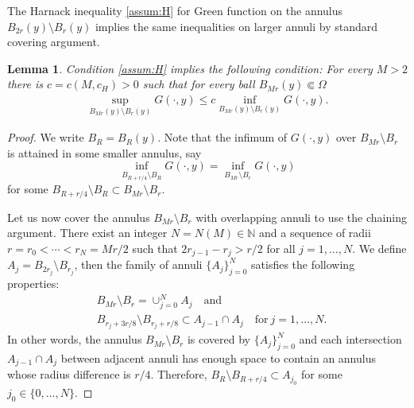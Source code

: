 \documentclass[reqno]{amsart}
\theoremstyle{plain}
\newtheorem{lemma}[theorem]{Lemma}
\theoremstyle{definition}
\numberwithin{equation}{section}
\newcommand{\cH} {c_H}
\begin{document}
The Harnack inequality \eqref{assum:H} for Green function on the annulus $B_{2r}(y) \setminus B_r(y)$ implies the same inequalities on larger annuli by standard covering argument.

\begin{lemma} \label{lem:Harnack}
Condition \eqref{assum:H} implies the following condition: For every $M >2$ there is $c=c(M, \cH) >0$ such that for every ball $B_{Mr}(y) \Subset \Omega$ 
\begin{align*}
\sup_{B_{Mr}(y) \setminus B_r(y)} G(\cdot, y) 
\leq c \inf_{B_{Mr}(y) \setminus B_r(y)} G(\cdot, y).
\end{align*}
\end{lemma}

\begin{proof}
We write $B_R = B_R(y)$. Note that the infimum of $G(\cdot, y)$ over 
$B_{Mr} \setminus B_r$ is attained in some smaller annulus, say
\begin{equation} \label{eq:inf_G}
\inf_{B_{R+r/4} \setminus B_{R}} G(\cdot, y) 
= \inf_{B_{Mr} \setminus B_r} G(\cdot, y)
\end{equation}
for some $B_{R+r/4} \setminus B_{R} \subset B_{Mr} \setminus B_r$.

Let us now cover the annulus $B_{Mr} \setminus B_r$ with 
overlapping annuli to use the chaining argument. 
There exist an integer $N = N(M) \in \mathbb{N}$ and
a sequence of radii $r = r_0 < \cdots < r_N = Mr/2$ such that 
$2r_{j-1} - r_{j} > r/2$ for all $j = 1, \dots, N$. 
We define $A_j = B_{2r_j} \setminus B_{r_j}$, then the family of 
annuli $\lbrace A_j \rbrace_{j=0}^N$ satisfies the following properties:
\begin{equation*}
\begin{split}
&B_{Mr} \setminus B_r = \cup_{j=0}^N A_j \quad\text{and} \\
&B_{r_j+3r/8} \setminus B_{r_j+r/8} \subset A_{j-1} \cap A_j
\quad\text{for}~ j=1, \dots, N.
\end{split}
\end{equation*}
In other words, the annulus $B_{Mr} \setminus B_{r}$ is covered by $\lbrace A_j \rbrace_{j=0}^N$ and each intersection $A_{j-1} \cap A_{j}$ between adjacent annuli has enough space to contain an annulus whose radius difference is $r/4$. Therefore, $B_R \setminus B_{R+r/4} \subset A_{j_0}$ for some 
$j_0 \in \lbrace 0, \dots, N\rbrace$.


\end{proof}
\end{document}
